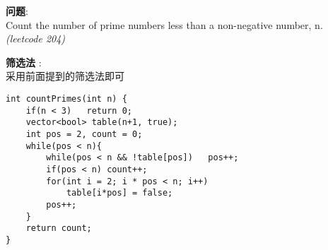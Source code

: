     
\begin{description}
    \item{\textbf{问题}}:\\
Count the number of prime numbers less than a non-negative number, n.\\
\textit{(leetcode 204)}
    \item{\textbf{筛选法}} : 
    \\采用前面提到的筛选法即可
    \begin{lstlisting}
int countPrimes(int n) {
	if(n < 3)	return 0;
	vector<bool> table(n+1, true);
	int pos = 2, count = 0;
	while(pos < n){
		while(pos < n && !table[pos])	pos++;
		if(pos < n) count++;
		for(int i = 2; i * pos < n; i++)
			table[i*pos] = false;
		pos++;
	}
	return count;
}
    \end{lstlisting}
\end{description}
